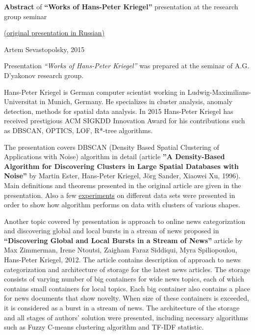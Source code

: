 \documentclass[11pt]{article}
\begin{document}
	{\large {\bf Abstract} of {\bf``Works of Hans-Peter Kriegel''} presentation at the research group seminar
	
	 \href{http://www.machinelearning.ru/wiki/images/4/4e/Sevastopolsky_-_report_H-P_Kriegel.pdf}{(original presentation in Russian)}
	\newline
	
	{Artem Sevastopolsky, 2015}}
	\newline
	\newline
	\newline
	\par
	Presentation \emph{``Works of Hans-Peter Kriegel''} was prepared at the seminar of A.G. D'yakonov research group. 
	
	Hans-Peter Kriegel is German computer scientist working in Ludwig-Maximilians-Universitat in Munich, Germany. He specializes in cluster analysis, anomaly detection, methods for spatial data analysis. In 2015 Hans-Peter Kriegel has received prestigious ACM SIGKDD Innovation Award for his contributions such as DBSCAN, OPTICS, LOF, R*-tree algorithms. 
	
	The presentation covers DBSCAN (Density Based Spatial Clustering of Applications with Noise) algorithm in detail (article  {\bf ''A Density-Based Algorithm for Discovering Clusters in Large Spatial Databases with Noise''} by Martin Ester, Hans-Peter Kriegel, Jörg Sander, Xiaowei Xu, 1996). Main definitions and theorems presented in the original article are given in the presentation. Also a few \href{http://www.naftaliharris.com/blog/visualizing-dbscan-clustering/}{experiments} on different data sets were presented in order to show how algorithm performs on data with clusters of various shapes.
	
	Another topic covered by presentation is approach to online news categorization and discovering global and local bursts in a stream of news proposed in {\bf ``Discovering Global and Local Bursts in a Stream of News''} article by Max Zimmerman, Irene Ntoutsi, Zaigham Faraz Siddiqui, Myra Spiliopoulou, Hans-Peter Kriegel, 2012. The article contains description of approach to news categorization and architecture of storage for the latest news articles. The storage consists of varying number of big containers for wide news topics, each of which contains small containers for local topics. Each big container also contains a place for news documents that show novelty. When size of these containers is exceeded, it is considered as a burst in a stream of news. The architecture of the storage and all stages of authors' solution were presented, including necessary algorithms such as Fuzzy C-means clustering algorithm and TF-IDF statistic.
\end{document}
